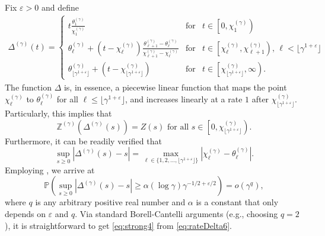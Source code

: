 \documentclass[11pt,leqno]{amsart}
\numberwithin{table}{section}
\numberwithin{figure}{section}
\numberwithin{equation}{section}
\newcommand{\1}{{\mathds{1}}}
\newcommand{\0}{\mat{0}}
\begin{document}
{Fix $\varepsilon>0$ and define
\begin{align}
\Delta^{(\gamma)}(t)=\left\{\begin{array}{ccc}  t\frac{\theta^{(\gamma)}_1}{\chi^{(\gamma)}_1}&\mbox{for}& t\in \left[0,\chi^{(\gamma)}_1\right)\\
\theta^{(\gamma)}_\ell + (t-\chi^{(\gamma)}_\ell)\frac{\theta^{(\gamma)}_{\ell+1}-\theta^{(\gamma)}_{\ell}}{\chi^{(\gamma)}_{\ell+1}-\chi^{(\gamma)}_{\ell}}&\mbox{for}& t\in \left[\chi^{(\gamma)}_\ell, \chi^{(\gamma)}_{\ell+1}\right),\,\ell<\lfloor \gamma^{1+\varepsilon}\rfloor\\
\theta^{(\gamma)}_{\lfloor \gamma^{1+\varepsilon}\rfloor} + (t-\chi^{(\gamma)}_{\lfloor \gamma^{1+\varepsilon}\rfloor})&\mbox{for}& t\in \left[\chi^{(\gamma)}_{\lfloor \gamma^{1+\varepsilon}\rfloor}, \infty\right).
\end{array}\right.\label{eq:defDelta1}
\end{align}
The function $\Delta$ is, in essence, a piecewise linear function that maps the point $\chi^{(\gamma)}_\ell$ to $\theta^{(\gamma)}_\ell$ for all $\ell\le \lfloor \gamma^{1+\varepsilon}\rfloor$, and increases linearly at a rate $1$ after $\chi^{(\gamma)}_{\lfloor \gamma^{1+\varepsilon}\rfloor}$. Particularly, this implies that 
\begin{equation}\label{eq:timechange1}
\mathbb{Z}^{(\gamma)}(\Delta^{(\gamma)}(s)) = Z(s) \mbox{ for all } s\in \left[0, \chi^{(\gamma)}_{\lfloor \gamma^{1+\varepsilon}\rfloor}\right).\end{equation} Furthermore, it can be readily verified that 
\begin{equation}\label{eq:rateDelta6}
\sup_{s\ge 0}|\Delta^{(\gamma)}(s) - s| = \max_{\ell\in\{1,2,\dots, \lfloor \gamma^{1+\varepsilon}\rfloor\} } \left|\chi^{(\gamma)}_\ell - \theta^{(\gamma)}_\ell\right|.
\end{equation}
Employing \cite[Lemma 1]{bladt_peralta}, we arrive {at}
\begin{equation}
\mathds{P}\left(\sup_{s\ge 0}|\Delta^{(\gamma)}(s) - s| \ge \alpha (\log \gamma) \gamma^{-1/2 + \varepsilon/2}\right) = o(\gamma^q),\label{eq:rateDelta5}
\end{equation}
where $q$ is any arbitrary positive real number and $\alpha$ is a constant that only depends on $\varepsilon$ and $q$. Via standard Borell-Cantelli arguments (e.g., choosing $q=2$), it is straightforward to get \eqref{eq:strong4} from \eqref{eq:rateDelta6}. 

}
\end{document}
